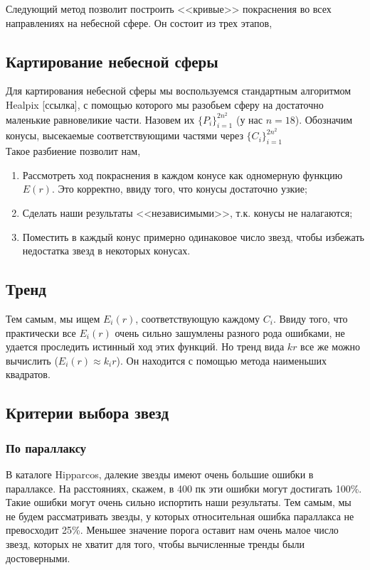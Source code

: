 \documentclass[14pt]{article}
\begin{document}
		Следующий метод позволит построить <<кривые>> покраснения во всех направлениях на небесной сфере. Он состоит из трех этапов,
        \subsection{Картирование небесной сферы}
            Для картирования небесной сферы мы воспользуемся стандартным алгоритмом Healpix [ссылка], с помощью которого мы разобьем сферу на достаточно маленькие равновеликие части. Назовем их $\{P_i\}_{i = 1}^{2n^2}$ (у нас $n = 18$). Обозначим конусы, высекаемые соответствующими частями через $\{C_i\}_{i = 1}^{2n^2}$\\
			Такое разбиение позволит нам,
            \begin{enumerate}
                \item Рассмотреть ход покраснения в каждом конусе как одномерную функцию $E(r)$. Это корректно, ввиду того, что конусы достаточно узкие;
                \item Сделать наши результаты <<независимыми>>, т.к. конусы не налагаются;
                \item Поместить в каждый конус примерно одинаковое число звезд, чтобы избежать недостатка звезд в некоторых конусах.  
            \end{enumerate}  
		  
	   \subsection{Тренд}
            Тем самым, мы ищем $E_i(r)$, соответствующую каждому $C_i$. Ввиду того, что практически все $E_i(r)$ очень сильно зашумлены разного рода ошибками, не удается проследить истинный ход этих функций. Но тренд вида $k r$ все же можно вычислить ($E_i(r) \approx k_i r$). Он находится с помощью метода наименьших квадратов.  
            
        \subsection{Критерии выбора звезд}
            \subsubsection{По параллаксу}
                В каталоге Hipparcos, далекие звезды имеют очень большие ошибки в параллаксе. На расстояниях, скажем, в 400 пк эти ошибки могут достигать 100\%. Такие ошибки могут очень сильно испортить наши результаты. Тем самым, мы не будем рассматривать звезды, у которых относительная ошибка параллакса не превосходит 25\%. Меньшее значение порога оставит нам очень малое число звезд, которых не хватит для того, чтобы вычисленные тренды были достоверными.
\end{document}
